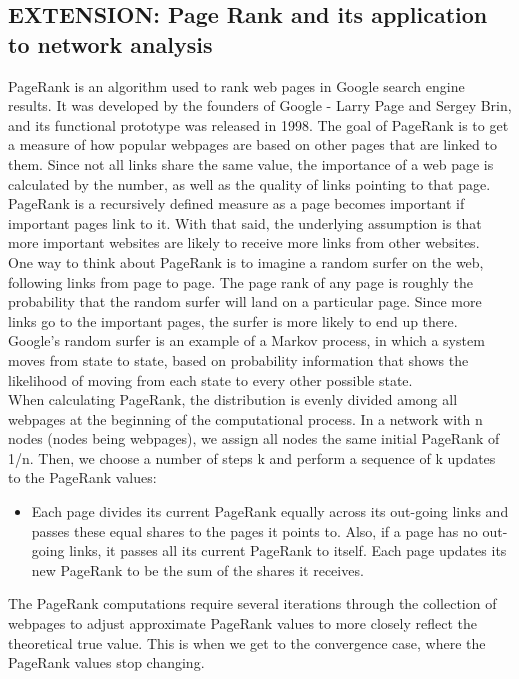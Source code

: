 \documentclass[conference]{IEEEtran}
\begin{document}
	\subsection{\textbf{EXTENSION:} Page Rank and its application to network analysis}
		{
			PageRank is an algorithm used to rank web pages in Google search engine results. It was developed by the founders of Google - Larry Page and Sergey Brin, and its functional prototype was released in 1998. The goal of PageRank is to get a measure of how popular webpages are based on other pages that are linked to them. Since not all links share the same value, the importance of a web page is calculated by the number, as well as the quality of links pointing to that page. PageRank is a recursively defined measure as a page becomes important if important pages link to it. With that said, the underlying assumption is that more important websites are likely to receive more links from other websites.\\
			
			One way to think about PageRank is to imagine a random surfer on the web, following links from page to page. The page rank of any page is roughly the probability that the random surfer will land on a particular page. Since more links go to the important pages, the surfer is more likely to end up there. Google’s random surfer is an example of a Markov process, in which a system moves from state to state, based on probability information that shows the likelihood of moving from each state to every other possible state.\\
			
			When calculating PageRank, the distribution is evenly divided among all webpages at the beginning of the computational process. In a network with n nodes (nodes being webpages), we assign all nodes the same initial PageRank of 1/n. Then, we choose a number of steps k and perform a sequence of k updates to the PageRank values:
			\begin{itemize}
				\item Each page divides its current PageRank equally across its out-going links and passes these equal shares to the pages it points to. Also, if a page has no out-going links, it passes all its current PageRank to itself. Each page updates its new PageRank to be the sum of the shares it receives.
			\end{itemize}
		
		The PageRank computations require several iterations through the collection of webpages to adjust approximate PageRank values to more closely reflect the theoretical true value. This is when we get to the convergence case, where the PageRank values stop changing.
		\par}
\end{document}
